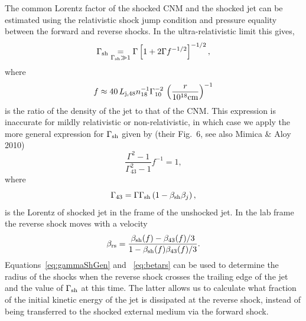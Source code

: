 \documentclass[usenatbib,fleqn]{mnras}
\begin{document}
The common Lorentz factor of the shocked CNM and the shocked jet can
be estimated using the relativistic shock jump condition and pressure
equality between the forward and reverse shocks.  In the
ultra-relativistic limit this gives,
\begin{equation}
\Gamma_{\rm sh} \underset{\Gamma_{\rm sh} \gg 1}= \Gamma\left[1 + 2\Gamma f^{-1/2}\right]^{-1/2},
\end{equation}
where
\begin{equation}
  f\approx 40\,  L_{\rm j,48} n_{18}^{-1} \Gamma_{10}^{-2} \, \left(\frac{r}{10^{18} {\rm
        cm}}\right)^{-1} 
\end{equation}
is the ratio of the density of the jet to that of the CNM.  This
expression is inaccurate for mildly relativistic or non-relativistic,
in which case we apply the more general expression for $\Gamma_{\rm
  sh}$ given by \citet{Beloborodov&Uhm2006} (their Fig.~6, see also
Mimica \& Aloy 2010)
\begin{equation}
\frac{\Gamma^2-1}{\Gamma_{43}^2-1} f^{-1}=1 ,
\end{equation}
where
\begin{equation}
  \Gamma_{43}=\Gamma \Gamma_{\rm sh} \left(1-\beta_{\rm sh} \beta_j\right),
\label{eq:gammaShGen}
\end{equation}
is the Lorentz of shocked jet in the frame of the unshocked jet. In
the lab frame the reverse shock moves with a velocity
\begin{equation}
\beta_{\rm rs}=\frac{\beta_{\rm sh}(f)-\beta_{43}(f)/3}{1-\beta_{\rm
    sh}(f) \beta_{43}(f)/3}.
\label{eq:betars}
\end{equation} 
%
Equations~\eqref{eq:gammaShGen} and ~\eqref{eq:betars} can be used to
determine the radius of the shocks when the reverse shock crosses the
trailing edge of the jet and the value of $\Gamma_{\rm sh}$ at this
time.  The latter allows us to calculate what fraction of the initial
kinetic energy of the jet is dissipated at the reverse shock, instead
of being transferred to the shocked external medium via the forward
shock.



\clearpage
  \footnotesize{
    
    
  }
\end{document}
